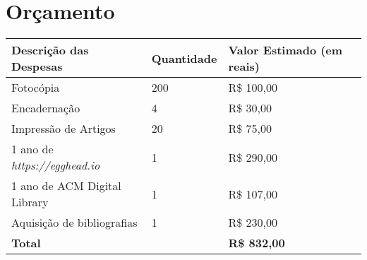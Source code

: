 \section{Orçamento}\label{lorcamento}

\begin{center}
  \tiny
  \begin{tabular}{| l | l | l | l |}
  \hline
  \textbf{Descrição das Despesas} & \textbf{Quantidade} & \textbf{Valor Estimado (em reais)} \\ \hline
  Fotocópia & 200 & R\$ 100,00 \\ \hline
  Encadernação & 4 & R\$ 30,00 \\ \hline
  Impressão de Artigos & 20 & R\$ 75,00 \\ \hline
  1 ano de \textit{https://egghead.io} & 1 & R\$ 290,00 \\ \hline
  1 ano de ACM Digital Library & 1 & R\$ 107,00 \\ \hline
  Aquisição de bibliografias & 1 & R\$ 230,00 \\
  \hline \hline
  \textbf{Total} & & \textbf{R\$ 832,00} \\
  \hline
  \end{tabular}
\end{center}
